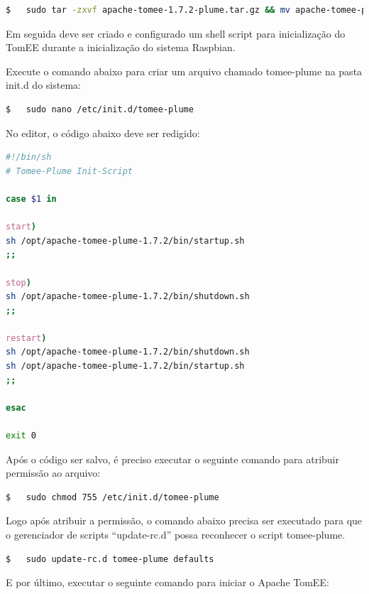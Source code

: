 \begin{lstlisting}[language=bash]
$   sudo tar -zxvf apache-tomee-1.7.2-plume.tar.gz && mv apache-tomee-plume-1.7.2 /opt/
\end{lstlisting}

Em seguida deve ser criado e configurado um shell script para inicialização do TomEE durante a inicialização do sistema Raspbian.

Execute o comando abaixo para criar um arquivo chamado tomee-plume na pasta init.d do sistema: \\

\begin{lstlisting}[language=bash]
$   sudo nano /etc/init.d/tomee-plume
\end{lstlisting}

No editor, o código abaixo deve ser redigido: \\ 

\begin{lstlisting}[language=bash,caption={bash version}]
#!/bin/sh
# Tomee-Plume Init-Script

case $1 in

start)
sh /opt/apache-tomee-plume-1.7.2/bin/startup.sh
;;

stop)
sh /opt/apache-tomee-plume-1.7.2/bin/shutdown.sh
;;

restart)
sh /opt/apache-tomee-plume-1.7.2/bin/shutdown.sh
sh /opt/apache-tomee-plume-1.7.2/bin/startup.sh
;;

esac

exit 0
\end{lstlisting}

Após o código ser salvo, é preciso executar o seguinte comando para atribuir permissão ao arquivo: \\

\begin{lstlisting}[language=bash]
$   sudo chmod 755 /etc/init.d/tomee-plume
\end{lstlisting}

Logo após atribuir a permissão, o comando abaixo precisa ser executado para que o gerenciador de scripts ``update-rc.d'' possa reconhecer o script tomee-plume. \\

\begin{lstlisting}[language=bash]
$   sudo update-rc.d tomee-plume defaults
\end{lstlisting}

E por último, executar o seguinte comando para iniciar o Apache TomEE: \\

